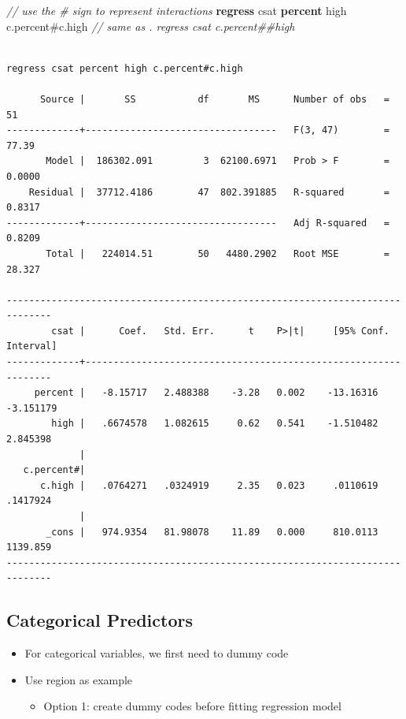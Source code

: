 \documentclass[]{book}
\newenvironment{Shaded}{\begin{snugshade}}{\end{snugshade}}
\newcommand{\CommentTok}[1]{\textcolor[rgb]{0.56,0.35,0.01}{\textit{#1}}}
\newcommand{\KeywordTok}[1]{\textcolor[rgb]{0.13,0.29,0.53}{\textbf{#1}}}
\newcommand{\NormalTok}[1]{#1}
\providecommand{\tightlist}{%
  \setlength{\itemsep}{0pt}\setlength{\parskip}{0pt}}
\begin{document}
\begin{Shaded}
\begin{Highlighting}[]
  \CommentTok{// use the # sign to represent interactions }
  \KeywordTok{regress}\NormalTok{ csat }\KeywordTok{percent}\NormalTok{ high c.percent#c.high}
  \CommentTok{// same as . regress csat c.percent##high}
\end{Highlighting}
\end{Shaded}

\begin{verbatim}

regress csat percent high c.percent#c.high

      Source |       SS           df       MS      Number of obs   =        51
-------------+----------------------------------   F(3, 47)        =     77.39
       Model |  186302.091         3  62100.6971   Prob > F        =    0.0000
    Residual |  37712.4186        47  802.391885   R-squared       =    0.8317
-------------+----------------------------------   Adj R-squared   =    0.8209
       Total |   224014.51        50   4480.2902   Root MSE        =    28.327

------------------------------------------------------------------------------
        csat |      Coef.   Std. Err.      t    P>|t|     [95% Conf. Interval]
-------------+----------------------------------------------------------------
     percent |   -8.15717   2.488388    -3.28   0.002    -13.16316   -3.151179
        high |   .6674578   1.082615     0.62   0.541    -1.510482    2.845398
             |
   c.percent#|
      c.high |   .0764271   .0324919     2.35   0.023     .0110619    .1417924
             |
       _cons |   974.9354   81.98078    11.89   0.000     810.0113    1139.859
------------------------------------------------------------------------------
\end{verbatim}

\hypertarget{categorical-predictors}{%
\subsection{Categorical Predictors}\label{categorical-predictors}}

\begin{itemize}
\tightlist
\item
  For categorical variables, we first need to dummy code
\item
  Use region as example

  \begin{itemize}
  \tightlist
  \item
    Option 1: create dummy codes before fitting regression model
  \end{itemize}
\end{itemize}
\end{document}
